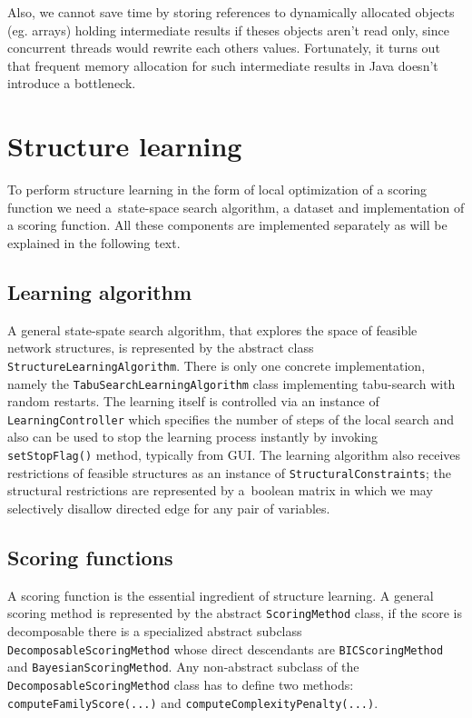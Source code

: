 \documentclass[english,cover]{fitthesis} %
\newcommand{\srccode}[1]{{\tt #1}}         %
\begin{document}
Also, we cannot save time by storing references to dynamically allocated objects (eg. arrays) holding intermediate results if theses objects aren't read only, since concurrent threads would rewrite each others values. Fortunately, it turns out that frequent memory allocation for such intermediate results in Java doesn't introduce a bottleneck.







\section{Structure learning}
To perform structure learning in the form of local optimization of a scoring function we need a~state-space search algorithm, a dataset and implementation of a scoring function. All these components are implemented separately as will be explained in the following text.

\subsection{Learning algorithm}
A general state-spate search algorithm, that explores the space of feasible network structures, is represented by the abstract class \srccode{StructureLearningAlgorithm}. There is only one concrete implementation, namely the \srccode{TabuSearchLearningAlgorithm} class implementing tabu-search with random restarts. The learning itself is controlled via an instance of \srccode{LearningController} which specifies the number of steps of the local search and also can be used to stop the learning process instantly by invoking \srccode{setStopFlag()} method, typically from GUI. The learning algorithm also receives restrictions of feasible structures as an instance of \srccode{StructuralConstraints}; the structural restrictions are represented by a~boolean matrix in which we may selectively disallow directed edge for any pair of variables.



\subsection{Scoring functions}
A scoring function is the essential ingredient of structure learning. A general scoring method is represented by the abstract \srccode{ScoringMethod} class, if the score is decomposable there is a specialized abstract subclass \srccode{DecomposableScoringMethod} whose direct descendants are \srccode{BICScoringMethod} and \srccode{BayesianScoringMethod}. Any non-abstract subclass of the \srccode{DecomposableScoringMethod} class has to define two methods: \srccode{computeFamilyScore(...)} and \srccode{computeComplexityPenalty(...)}.
\end{document}
